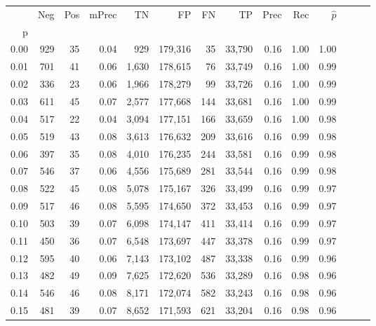 \begin{tabular}{rrrrrrrrrrrrrr}
\toprule
{} &    Neg &    Pos & mPrec &       TN &       FP &      FN &      TP &  Prec &   Rec & $\hat{p}$ \\
p    &        &        &       &          &          &         &         &       &       &           \\
\midrule
0.00 &    929 &     35 &  0.04 &      929 &  179,316 &      35 &  33,790 &  0.16 &  1.00 &      1.00 \\
0.01 &    701 &     41 &  0.06 &    1,630 &  178,615 &      76 &  33,749 &  0.16 &  1.00 &      0.99 \\
0.02 &    336 &     23 &  0.06 &    1,966 &  178,279 &      99 &  33,726 &  0.16 &  1.00 &      0.99 \\
0.03 &    611 &     45 &  0.07 &    2,577 &  177,668 &     144 &  33,681 &  0.16 &  1.00 &      0.99 \\
0.04 &    517 &     22 &  0.04 &    3,094 &  177,151 &     166 &  33,659 &  0.16 &  1.00 &      0.98 \\
0.05 &    519 &     43 &  0.08 &    3,613 &  176,632 &     209 &  33,616 &  0.16 &  0.99 &      0.98 \\
0.06 &    397 &     35 &  0.08 &    4,010 &  176,235 &     244 &  33,581 &  0.16 &  0.99 &      0.98 \\
0.07 &    546 &     37 &  0.06 &    4,556 &  175,689 &     281 &  33,544 &  0.16 &  0.99 &      0.98 \\
0.08 &    522 &     45 &  0.08 &    5,078 &  175,167 &     326 &  33,499 &  0.16 &  0.99 &      0.97 \\
0.09 &    517 &     46 &  0.08 &    5,595 &  174,650 &     372 &  33,453 &  0.16 &  0.99 &      0.97 \\
0.10 &    503 &     39 &  0.07 &    6,098 &  174,147 &     411 &  33,414 &  0.16 &  0.99 &      0.97 \\
0.11 &    450 &     36 &  0.07 &    6,548 &  173,697 &     447 &  33,378 &  0.16 &  0.99 &      0.97 \\
0.12 &    595 &     40 &  0.06 &    7,143 &  173,102 &     487 &  33,338 &  0.16 &  0.99 &      0.96 \\
0.13 &    482 &     49 &  0.09 &    7,625 &  172,620 &     536 &  33,289 &  0.16 &  0.98 &      0.96 \\
0.14 &    546 &     46 &  0.08 &    8,171 &  172,074 &     582 &  33,243 &  0.16 &  0.98 &      0.96 \\
0.15 &    481 &     39 &  0.07 &    8,652 &  171,593 &     621 &  33,204 &  0.16 &  0.98 &      0.96 \\

\end{tabular}
